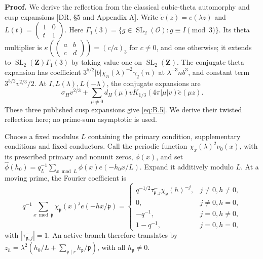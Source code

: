 \documentclass[11pt,a4paper]{article}
\begin{document}
\textbf{Proof.} We derive the reflection from the classical cubic-theta automorphy and cusp expansions {[}DR, §5 and Appendix A{]}. Write \(\check e(z)=e(\lambda z)\) and \(L(t)=\left(\begin{smallmatrix}1&0\\t&1\end{smallmatrix}\right)\). Here \(\Gamma_1(3)=\{g\in\operatorname{SL}_2(\mathcal O):g\equiv I\pmod3\}\). Its theta multiplier is \(\kappa(\left(\begin{smallmatrix}a&b\\c&d\end{smallmatrix}\right))=(c/a)_3\) for \(c\ne0\), and one otherwise; it extends to \(\operatorname{SL}_2(\mathbf Z)\Gamma_1(3)\) by taking value one on \(\operatorname{SL}_2(\mathbf Z)\). The conjugate theta expansion has coefficient \(3^{5/2}|b|\chi_n(\lambda)^{-2}\gamma_2(n)\) at \(\lambda^{-3}nb^3\), and constant term \(3^{5/2}v^{2/3}/2\). At \(I,L(\lambda),L(-\lambda)\), the conjugate expansions are \[
\sigma_Hv^{2/3}+\sum_{\mu\ne0}d_H(\mu)vK_{1/3}(4\pi|\mu|v)\check e(\mu z).
\tag{B.8}\label{eq:B.8}
\] These three published cusp expansions give \eqref{eq:B.5}. We derive their twisted reflection here; no prime-sum asymptotic is used.

Choose a fixed modulus \(L\) containing the primary condition, supplementary conditions and fixed conductors. Call the periodic function \(\chi_x(\lambda)^2\nu_0(x)\), with its prescribed primary and nonunit zeros, \(\phi(x)\), and set \(\widehat\phi(h_0)=q_L^{-1}\sum_{x\bmod L}\phi(x)e(-h_0x/L)\). Expand it additively modulo \(L\). At a moving prime, the Fourier coefficient is \[
q^{-1}\sum_{x\bmod\mathfrak p}\chi_{\mathfrak p}(x)^j e(-hx/\mathfrak p)
=\begin{cases}
q^{-1/2}\tau^-_{\mathfrak p,j}\chi_{\mathfrak p}(h)^{-j},&j\ne0, h\ne0,\\
0,&j\ne0, h=0,\\
-q^{-1},&j=0, h\ne0,\\
1-q^{-1},&j=0, h=0,
\end{cases}
\tag{B.9}\label{eq:B.9}
\] with \(|\tau^-_{\mathfrak p,j}|=1\). An active branch therefore translates by \(z_h=\lambda^2(h_0/L+\sum_{\mathfrak p\mid r}h_{\mathfrak p}/\mathfrak p)\), with all \(h_{\mathfrak p}\ne0\).
\end{document}

